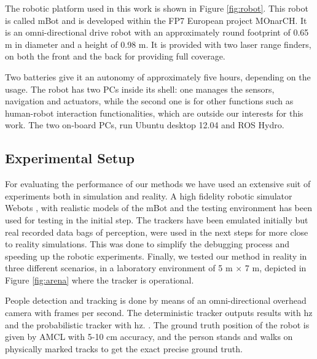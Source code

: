 The robotic platform used in this work is shown in Figure \ref{fig:robot}. This robot is called mBot \cite{Messias2014robotic} and is developed within the FP7 European project MOnarCH.
It is an omni-directional drive robot with an approximately round footprint of 0.65 m in diameter and a height of 0.98 m.
It is provided with two laser range finders, on both the front and the back for providing full coverage.

Two batteries give it an autonomy of approximately five hours, depending on the usage.
The robot has two PCs inside its shell: one manages the sensors, navigation and actuators, while the second one is for other functions such as human-robot interaction functionalities, which are outside our interests for this work. The two on-board PCs, run Ubuntu desktop 12.04 and ROS Hydro. 


\subsection{Experimental Setup}
\label{sec:Experimental_setup}


For evaluating the performance of our methods we have used an extensive suit of experiments both in simulation and reality. A high fidelity robotic simulator Webots \cite{michel1998webots}, with realistic models of the mBot and the testing environment has been used for testing in the initial step. The trackers have been emulated initially but real recorded data bags of perception, were used in the next steps for more close to reality simulations. This was done to simplify the debugging process and speeding up the robotic experiments. %
Finally, we tested our method in reality in three different scenarios, in a laboratory environment of 5 m $\times$ 7 m, depicted in Figure \ref{fig:arena} where the tracker is operational.
 


People detection and tracking is done by means of an omni-directional overhead camera  with  frames per second. The deterministic tracker outputs results with   hz and the probabilistic tracker with   hz.  . The ground truth position of the robot is given by AMCL with 5-10 cm accuracy, and the person stands and walks on physically marked tracks to get the exact precise ground truth.


